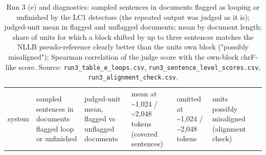 \begin{table}[t]
\centering
\footnotesize
\setlength{\tabcolsep}{3pt}
\caption{Run 3 (e) and diagnostics: sampled sentences in documents flagged as looping or unfinished by the LC1 detectors (the repeated output was judged as it is); judged-unit mean in flagged and unflagged documents; mean by document length; share of units for which a block shifted by up to three sentences matches the NLLB pseudo-reference clearly better than the unit\textquotesingle s own block ("possibly misaligned"); Spearman correlation of the judge score with the own-block chrF-like score. Source: \texttt{run3\_table\_e\_loops.csv}, \texttt{run3\_sentence\_level\_scores.csv}, \texttt{run3\_alignment\_check.csv}.}
\label{tab:t_judge_j2_run3_diag}
{\def\LTcaptype{none} %
\begin{tabular}{@{}
  >{\raggedright\arraybackslash}p{}
  >{\raggedleft\arraybackslash}p{}
  >{\raggedleft\arraybackslash}p{}
  >{\raggedleft\arraybackslash}p{}
  >{\raggedleft\arraybackslash}p{}
  >{\raggedleft\arraybackslash}p{}
  >{\raggedleft\arraybackslash}p{}@{}}
\toprule
\begin{minipage}[b]{\linewidth}\raggedright
system
\end{minipage} & \begin{minipage}[b]{\linewidth}\raggedleft
sampled sentences in documents flagged loop or unfinished
\end{minipage} & \begin{minipage}[b]{\linewidth}\raggedleft
judged-unit mean, flagged vs unflagged documents
\end{minipage} & \begin{minipage}[b]{\linewidth}\raggedleft
mean at \textasciitilde1,024 / \textasciitilde2,048 tokens (covered sentences)
\end{minipage} & \begin{minipage}[b]{\linewidth}\raggedleft
omitted at \textasciitilde1,024 / \textasciitilde2,048 tokens
\end{minipage} & \begin{minipage}[b]{\linewidth}\raggedleft
units possibly misaligned (alignment check)
\end{minipage} & \begin{minipage}[b]{\linewidth}\raggedleft

\end{minipage}
\end{tabular}}
\end{table}
